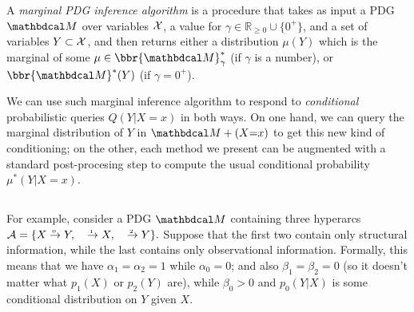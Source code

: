\documentclass[twoside]{article}
\begin{document}
\begin{defn}
    A \emph{marginal PDG inference algorithm} is a procedure
    that takes as input
    a PDG $\dg M$ over variables $\mathcal X$,
    a value for $\gamma \in \mathbb R_{\ge 0} \cup \{0^+\}$,
    and
    a set of variables $Y \subset \mathcal X$,
    and then returns either a distribution $\mu(Y)$
    which is the
    marginal
    of some $\mu \in \bbr{\dg M}^*_\gamma$  (if $\gamma$ is a number),
    or $\bbr{\dg M}^*(Y)$ (if $\gamma = 0^+$).
\end{defn}

We can use such marginal inference algorithm
to respond to \emph{conditional} probabilistic queries
$Q(Y|X{=}x)$ in both ways.
On one hand, we can query the marginal distribution of $Y$ in $\dg M + (X{=}x)$
to get this new kind of conditioning;
%
on the other,
each method we present can be augmented with a standard post-procesing step
to compute the usual conditional probability $\mu^*(Y|X{=}x)$.


\subsection{}
\label{sec:example-gamma}
For example, consider a PDG $\dg M$ containing three hyperarcs
$
    \Ar = \{ \ed0XY, \quad \ed{1}{}{X}, \quad \ed2{}Y  \}.
$
Suppose that the first two contain only structural information, 
while the last contains only observational information. 
Formally, this means that we have $\alpha_1 = \alpha_2 = 1$ while $\alpha_0 = 0$;
and also $\beta_1 = \beta_2 = 0$ (so it doesn't matter what $p_1(X)$ or $p_2(Y)$ are), while $\beta_0 > 0$ and $p_0(Y|X)$ is some conditional distribution on $Y$ given $X$. 
\end{document}
